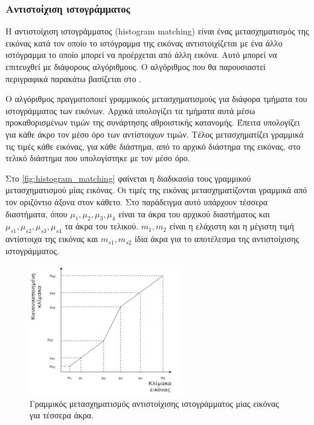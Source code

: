 \documentclass[a4paper,12pt]{article}
\begin{document}
\subsubsection{Αντιστοίχιση ιστογράμματος} \label{histogram:1}

Η αντιστοίχιση ιστογράμματος (histogram matching) είναι ένας μετασχηματισμός της
εικόνας κατά τον οποίο το ιστόγραμμα της εικόνας αντιστοιχίζεται με ένα άλλο
ιστόγραμμα το οποίο μπορεί να προέρχεται από άλλη εικόνα. Αυτό μπορεί να
επιτευχθεί με διάφορους αλγόριθμους. Ο αλγόριθμος που θα παρουσιαστεί
περιγραφικά παρακάτω βασίζεται στο \cite{histogram_matching:1}.

Ο αλγόριθμος πραγματοποιεί γραμμικούς μετασχηματισμούς για διάφορα τμήματα του
ιστογράμματος των εικόνων. Αρχικά υπολογίζει τα τμήματα αυτά μέσω
προκαθορισμένων τιμών της συνάρτησης αθροιστικής κατανομής. Έπειτα υπολογίζει
για κάθε άκρο τον μέσο όρο των αντίστοιχων τιμών. Τέλος μετασχηματίζει γραμμικά
τις τιμές κάθε εικόνας, για κάθε διάστημα, από το αρχικό διάστημα της εικόνας,
στο τελικό διάστημα που υπολογίστηκε με τον μέσο όρο.

Στο \autoref{fig:histogram_matching} φαίνεται η διαδικασία τους γραμμικού
μετασχηματισμού μίας εικόνας. Οι τιμές της εικόνας μετασχηματίζονται γραμμικά
από τον οριζόντιο άξονα στον κάθετο. Στο παράδειγμα αυτό υπάρχουν τέσσερα
διαστήματα, όπου $\mu_1, \mu_2, \mu_3, \mu_4$ είναι τα άκρα του αρχικού
διαστήματος και $\mu_{s1}, \mu_{s2}, \mu_{s3}, \mu_{s4}$ τα άκρα του τελικού.
$m_1, m_2$ είναι η ελάχιστη και η μέγιστη τιμή αντίστοιχα της εικόνας και
$m_{s1}, m_{s2}$ ίδια άκρα για το αποτέλεσμα της αντιστοίχισης ιστογράμματος.

\begin{figure}[H]
    \centering
    \includegraphics[width=0.6\textwidth]{histogram_matching_2}

    \caption{Γραμμικός μετασχηματισμός αντιστοίχισης ιστογράμματος μίας εικόνας
             για τέσσερα άκρα.}
    \label{fig:histogram_matching}
\end{figure}
\end{document}
